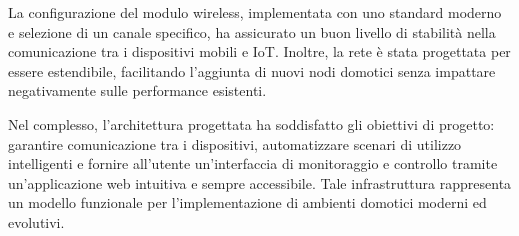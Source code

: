 \documentclass[a4paper,12pt]{article}
\begin{document}
La configurazione del modulo wireless, implementata con uno standard moderno e selezione di un canale specifico, ha assicurato un buon livello di stabilità nella comunicazione tra i dispositivi mobili e IoT. Inoltre, la rete è stata progettata per essere estendibile, facilitando l’aggiunta di nuovi nodi domotici senza impattare negativamente sulle performance esistenti.

Nel complesso, l’architettura progettata ha soddisfatto gli obiettivi di progetto: garantire comunicazione tra i dispositivi, automatizzare scenari di utilizzo intelligenti e fornire all’utente un’interfaccia di monitoraggio e controllo tramite un’applicazione web intuitiva e sempre accessibile. Tale infrastruttura rappresenta un modello funzionale per l’implementazione di ambienti domotici moderni ed evolutivi.
\end{document}
